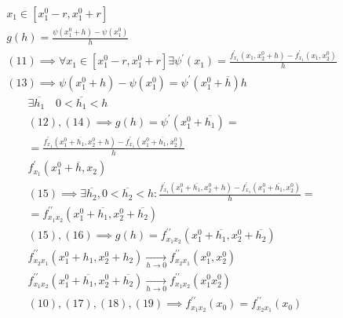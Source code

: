 \documentclass[main]{subfiles}
\begin{document}
\begin{longProof}
            \begin{gather*}
                x_1 \in [x_1^0-r,x_1^0+r] \\
                g(h) = \frac{\psi(x^0_1+h)-\psi(x_1^0)}{h} \tag{12}\\
                (11) \implies \forall x_1 \in [x_1^0-r,x_1^0+r] \exists \psi^\prime(x_1) =
                \frac{f^\prime_{x_1}(x_1,x_2^0+h)-f^\prime_{x_1}(x_1,x_2^0)}{h} \tag{13}\\
                (13) \implies \psi (x_1^0+h) - \psi(x_1^0) = \psi^\prime(x_1^0+\overline{h})h \tag{14}
            \end{gather*}
            \begin{gather*}
                \exists \overline{h_1} \quad 0 < \overline{h_1} < h \\
                (12),(14) \implies g(h) = \psi^\prime(x_1^0 + \overline{h_1}) = \\ =
                 \frac{f^\prime_{x_1}(x_1^0+\overline{h_1},x_2^0+h)-f^\prime_{x_1}(x_1^0+\overline{h_1},x_2^0)}{h} \tag{15}\\
                f^\prime_{x_1}(x_1^0 + \overline{h}, x_2) \\
                (15) \implies \exists \overline{h_2}, 0 < \overline{h_2} < h : 
                \frac{f^\prime_{x_1}(x_1^0 + \overline{h_1}, x_2^0 + h) - f^\prime_{x_1}(x_1^0 + \overline{h_1}, x_2^0)}{h} = \\
               = f^{\prime\prime}_{x_1 x_2}(x_1^0 + \overline{h_1}, x_2^0 + \overline{h_2}) \tag{16} \\
                (15),(16) \implies g(h) = f^{\prime\prime}_{x_1x_2}(x_1^0+ \overline{h_1}, x_2^0 + \overline{h_2}) \tag{17}\\
                f^{\prime\prime}_{x_2x_1}(x_1^0+ h_1, x_2^0 + h_2) \underset{h \to 0}{\rightarrow} f^{\prime\prime}_{x_2x_1}(x_1^0, x_2^0) \tag{18}\\
            f^{\prime\prime}_{x_1x_2}(x_1^0+ \overline{h_1}, x_2^0 + \overline{h_2}) \underset{h \to 0}{\rightarrow} f^{\prime\prime}_{x_1x_2}(x_1^0x_2^0) \tag{19}\\
            (10), (17), (18), (19) \implies f^{\prime\prime}_{x_1x_2}(x_0) = f^{\prime\prime}_{x_2x_1}(x_0)
            \end{gather*}
        \end{longProof}
\end{document}
